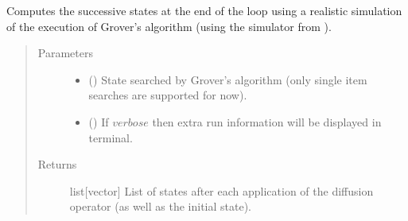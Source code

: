\documentclass[letterpaper,10pt,english]{sphinxmanual}
\begin{document}
\begin{fulllineitems}
\label{\detokenize{grover:grover.grover_vanilla}}
Computes the successive states at the end of the loop using a realistic
simulation of the execution of Grover’s algorithm (using the simulator
from ).
\begin{quote}\begin{description}
\item[{Parameters}] \leavevmode\begin{itemize}
\item {} 
 (\sphinxstyleliteralemphasis{\sphinxupquote{{[}}}\sphinxstyleliteralemphasis{\sphinxupquote{{]}}}) \textendash{} State searched by Grover’s algorithm 
(only single item searches are supported for now).

\item {} 
 () \textendash{} If \(verbose\) then extra run information will be displayed 
in terminal.

\end{itemize}

\item[{Returns}] \leavevmode
list{[}vector{]} \textendash{} List of states after each application of the 
diffusion operator (as well as the initial state).

\end{description}\end{quote}

\end{fulllineitems}

\end{document}
